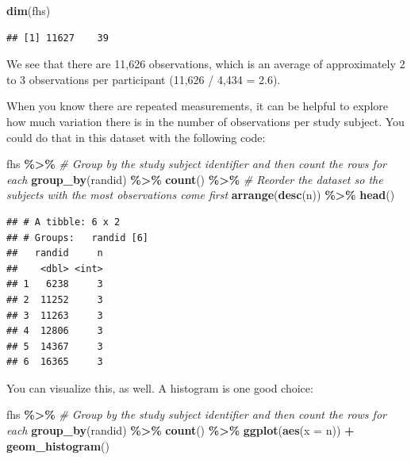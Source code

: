 \documentclass[
]{book}
\newenvironment{Shaded}{\begin{snugshade}}{\end{snugshade}}
\newcommand{\AttributeTok}[1]{\textcolor[rgb]{0.13,0.29,0.53}{#1}}
\newcommand{\CommentTok}[1]{\textcolor[rgb]{0.56,0.35,0.01}{\textit{#1}}}
\newcommand{\FunctionTok}[1]{\textcolor[rgb]{0.13,0.29,0.53}{\textbf{#1}}}
\newcommand{\NormalTok}[1]{#1}
\newcommand{\SpecialCharTok}[1]{\textcolor[rgb]{0.81,0.36,0.00}{\textbf{#1}}}
\begin{document}
\begin{Shaded}
\begin{Highlighting}[]
\FunctionTok{dim}\NormalTok{(fhs)}
\end{Highlighting}
\end{Shaded}

\begin{verbatim}
## [1] 11627    39
\end{verbatim}

We see that there are 11,626 observations, which is an average of approximately 2 to 3 observations per participant (11,626 / 4,434 = 2.6).

When you know there are repeated measurements, it can be helpful to explore
how much variation there is in the number of observations per study subject.
You could do that in this dataset with the following code:

\begin{Shaded}
\begin{Highlighting}[]
\NormalTok{fhs }\SpecialCharTok{\%\textgreater{}\%} 
  \CommentTok{\# Group by the study subject identifier and then count the rows for each}
  \FunctionTok{group\_by}\NormalTok{(randid) }\SpecialCharTok{\%\textgreater{}\%} 
  \FunctionTok{count}\NormalTok{() }\SpecialCharTok{\%\textgreater{}\%} 
  \CommentTok{\# Reorder the dataset so the subjects with the most observations come first}
  \FunctionTok{arrange}\NormalTok{(}\FunctionTok{desc}\NormalTok{(n)) }\SpecialCharTok{\%\textgreater{}\%} 
  \FunctionTok{head}\NormalTok{()}
\end{Highlighting}
\end{Shaded}

\begin{verbatim}
## # A tibble: 6 x 2
## # Groups:   randid [6]
##   randid     n
##    <dbl> <int>
## 1   6238     3
## 2  11252     3
## 3  11263     3
## 4  12806     3
## 5  14367     3
## 6  16365     3
\end{verbatim}

You can visualize this, as well. A histogram is one good choice:

\begin{Shaded}
\begin{Highlighting}[]
\NormalTok{fhs }\SpecialCharTok{\%\textgreater{}\%} 
  \CommentTok{\# Group by the study subject identifier and then count the rows for each}
  \FunctionTok{group\_by}\NormalTok{(randid) }\SpecialCharTok{\%\textgreater{}\%} 
  \FunctionTok{count}\NormalTok{() }\SpecialCharTok{\%\textgreater{}\%} 
  \FunctionTok{ggplot}\NormalTok{(}\FunctionTok{aes}\NormalTok{(}\AttributeTok{x =}\NormalTok{ n)) }\SpecialCharTok{+} 
  \FunctionTok{geom\_histogram}\NormalTok{()}
\end{Highlighting}
\end{Shaded}
\end{document}

